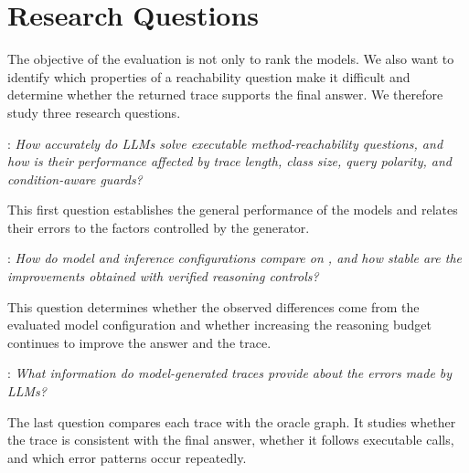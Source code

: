 \section{Research Questions}
\label{sec:research-questions}

The objective of the evaluation is not only to rank the models. We also want to identify which properties of a reachability question make it difficult and determine whether the returned trace supports the final answer. We therefore study three research questions.

\noindent{}: \emph{How accurately do LLMs solve executable method-reachability questions, and how is their performance affected by trace length, class size, query polarity, and condition-aware guards?}

This first question establishes the general performance of the models and relates their errors to the factors controlled by the generator.

\noindent{}: \emph{How do model and inference configurations compare on \benchmark, and how stable are the improvements obtained with verified reasoning controls?}

This question determines whether the observed differences come from the evaluated model configuration and whether increasing the reasoning budget continues to improve the answer and the trace.

\noindent{}: \emph{What information do model-generated traces provide about the errors made by LLMs?}

The last question compares each trace with the oracle graph. It studies whether the trace is consistent with the final answer, whether it follows executable calls, and which error patterns occur repeatedly.
